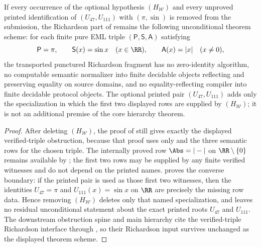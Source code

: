 \begin{corollary}
\label{cor:printed-string-free-richardson-spine}
If every occurrence of the optional hypothesis \((H_{\mathcal W})\) and every
unproved printed identification of \((U_{47},U_{111})\) with \((\pi,\sin)\) is
removed from the submission, the Richardson part of
remains the following unconditional theorem scheme: for each finite pure EML
triple \((\mathsf P,\mathsf S,\mathsf A)\) satisfying
\[
  \mathsf P=\pi,
  \qquad \mathsf S(x)=\sin x\quad(x\in\RR),
  \qquad \mathsf A(x)=|x|\quad(x\ne0),
\]
the transported punctured Richardson fragment has no zero-identity algorithm, no
computable semantic normalizer into finite decidable objects reflecting and
preserving equality on source domains, and no equality-reflecting compiler into
finite decidable protocol objects.  The optional printed pair
\((U_{47},U_{111})\) adds only the specialization in which the first two displayed
rows are supplied by \((H_{\mathcal W})\); it is not an additional premise of the
core hierarchy theorem.
\end{corollary}

\begin{proof}
After deleting \((H_{\mathcal W})\), the proof of
 still gives exactly the
displayed verified-triple obstruction, because that proof uses only
and the three semantic rows for the chosen triple.  The internally proved row
\(\Abs=|-|\) on \(\RR\setminus\{0\}\) remains available by
; the first two rows may be supplied by
any finite verified witnesses and do not depend on the printed names.
 proves the converse boundary: if the
printed pair is used as those first two witnesses, then the identities
\(U_{47}=\pi\) and \(U_{111}(x)=\sin x\) on \(\RR\) are precisely the missing row
data.  Hence removing \((H_{\mathcal W})\) deletes only that named
specialization, and leaves no residual unconditional statement about the exact
printed roots \(U_{47}\) and \(U_{111}\).  The downstream obstruction spine and
main hierarchy cite the verified-triple Richardson interface through
, so their Richardson input
survives unchanged as the displayed theorem scheme.
\end{proof}

